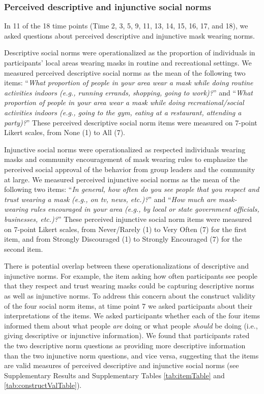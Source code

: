 \documentclass[
  man, donotrepeattitle,floatsintext]{apa6}
\begin{document}
\hypertarget{perceived-descriptive-and-injunctive-social-norms}{%
\subsubsection{Perceived descriptive and injunctive social norms}\label{perceived-descriptive-and-injunctive-social-norms}}

In 11 of the 18 time points (Time 2, 3, 5, 9, 11, 13, 14, 15, 16, 17, and 18), we asked questions about perceived descriptive and injunctive mask wearing norms.

Descriptive social norms were operationalized as the proportion of individuals in participants' local areas wearing masks in routine and recreational settings. We measured perceived descriptive social norms as the mean of the following two items: ``\emph{What proportion of people in your area wear a mask while doing routine activities indoors (e.g., running errands, shopping, going to work)?}'' and ``\emph{What proportion of people in your area wear a mask while doing recreational/social activities indoors (e.g., going to the gym, eating at a restaurant, attending a party)?}'' These perceived descriptive social norm items were measured on 7-point Likert scales, from None (1) to All (7).

Injunctive social norms were operationalized as respected individuals wearing masks and community encouragement of mask wearing rules to emphasize the perceived social approval of the behavior from group leaders and the community at large. We measured perceived injunctive social norms as the mean of the following two items: ``\emph{In general, how often do you see people that you respect and trust wearing a mask (e.g., on tv, news, etc.)?}'' and ``\emph{How much are mask-wearing rules encouraged in your area (e.g., by local or state government officials, businesses, etc.)?}'' These perceived injunctive social norm items were measured on 7-point Likert scales, from Never/Rarely (1) to Very Often (7) for the first item, and from Strongly Discouraged (1) to Strongly Encouraged (7) for the second item.

There is potential overlap between these operationalizations of descriptive and injunctive norms. For example, the item asking how often participants see people that they respect and trust wearing masks could be capturing descriptive norms as well as injunctive norms. To address this concern about the construct validity of the four social norm items, at time point 7 we asked participants about their interpretations of the items. We asked participants whether each of the four items informed them about what people \emph{are} doing or what people \emph{should} be doing (i.e., giving descriptive or injunctive information). We found that participants rated the two descriptive norm questions as providing more descriptive information than the two injunctive norm questions, and vice versa, suggesting that the items are valid measures of perceived descriptive and injunctive social norms (see Supplementary Results and Supplementary Tables \ref{tab:itemTable} and \ref{tab:constructValTable}).
\end{document}

